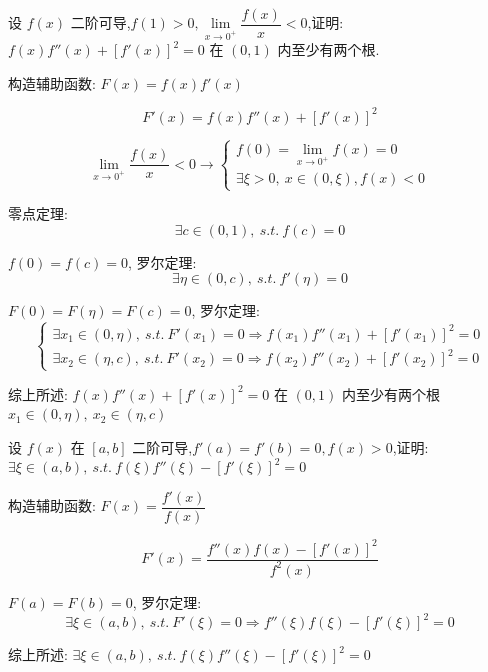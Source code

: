 \begin{proposition}
	设 $f(x)$ 二阶可导,$f(1)> 0,\lim\limits_{x\rightarrow 0^{+}}\dfrac{f(x)}{x}<0$,证明: $f(x)f''(x)+[f'(x)]^2=0$ 在 $(0,1)$ 内至少有两个根.
\end{proposition}
\begin{solution}

	构造辅助函数: $F(x)=f(x)f'(x)$

	$$F'(x)=f(x)f''(x)+[f'(x)]^2$$

	
	$$ \lim\limits_{x\rightarrow 0^{+}}\dfrac{f(x)}{x}<0\to
	\begin{cases}
		f(0)=\lim\limits_{x\rightarrow 0^{+}}f(x)=0 \\
		\exists\xi>0,\ x\in(0,\xi),f(x)<0
	\end{cases}
	$$

	零点定理:
	$$\exists c\in(0,1),\ s.t.\ f(c)=0$$

	$f(0) = f(c) = 0$, 罗尔定理:
	$$\exists\eta\in(0,c),\ s.t.\ f'(\eta)=0$$



	$F(0) = F(\eta) = F(c) = 0$, 罗尔定理:
	$$\begin{cases}
		\exists x_{1}\in(0,\eta),\ s.t.\ F'(x_{1})=0\Rightarrow f(x_{1})f''(x_{1})+[f'(x_{1})]^2=0 \\
		\exists x_{2}\in(\eta,c),\ s.t.\ F'(x_{2})=0\Rightarrow f(x_{2})f''(x_{2})+[f'(x_{2})]^2=0
	\end{cases}$$

	综上所述: $f(x)f''(x)+[f'(x)]^2=0$ 在 $(0,1)$ 内至少有两个根 $x_{1}\in(0,\eta),\ x_{2}\in(\eta,c)$
\end{solution}

\begin{proposition}
	设 $f(x)$ 在 $[a,b]$ 二阶可导,$f'(a)=f'(b)=0,f(x)>0$,证明: $\exists \xi\in(a,b),\ s.t.\ f(\xi)f''(\xi)-[f'(\xi)]^2=0$
\end{proposition}
\begin{solution}

	构造辅助函数: $F(x)=\dfrac{f'(x)}{f(x)}$

	$$F'(x)=\dfrac{f''(x)f(x)-[f'(x)]^2}{f^{2}(x)}$$

	$F(a) = F(b) = 0$, 罗尔定理:
	$$\exists \xi\in(a,b),\ s.t.\ F'(\xi)=0\Rightarrow f''(\xi)f(\xi)-[f'(\xi)]^2=0$$

	综上所述: $\exists \xi\in(a,b),\ s.t.\ f(\xi)f''(\xi)-[f'(\xi)]^2=0$
\end{solution}

